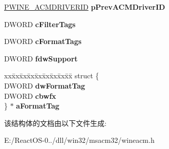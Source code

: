 \begin{DoxyCompactItemize}
\item 
\mbox{\label{struct___w_i_n_e___a_c_m_d_r_i_v_e_r_i_d_a5faa886450ad2e683dde696650d52ecd}} 
\hyperlink{struct___w_i_n_e___a_c_m_d_r_i_v_e_r_i_d}{P\+W\+I\+N\+E\+\_\+\+A\+C\+M\+D\+R\+I\+V\+E\+R\+ID} {\bfseries p\+Prev\+A\+C\+M\+Driver\+ID}
\item 
\mbox{\label{struct___w_i_n_e___a_c_m_d_r_i_v_e_r_i_d_ac4212ffb69fd5502901a0599d63cd58d}} 
D\+W\+O\+RD {\bfseries c\+Filter\+Tags}
\item 
\mbox{\label{struct___w_i_n_e___a_c_m_d_r_i_v_e_r_i_d_ad9f54979cb8f7a02d738ad0c9209b10a}} 
D\+W\+O\+RD {\bfseries c\+Format\+Tags}
\item 
\mbox{\label{struct___w_i_n_e___a_c_m_d_r_i_v_e_r_i_d_a28c8df65725727f2fb10f0c61301c9a6}} 
D\+W\+O\+RD {\bfseries fdw\+Support}
\item 
\mbox{\label{struct___w_i_n_e___a_c_m_d_r_i_v_e_r_i_d_a4395b550c2bce4531aeacded2275c12d}} 
\begin{tabbing}
xx\=xx\=xx\=xx\=xx\=xx\=xx\=xx\=xx\=\kill
struct \{\\
\>DWORD {\bfseries dwFormatTag}\\
\>DWORD {\bfseries cbwfx}\\
\} $\ast$ {\bfseries aFormatTag}\\

\end{tabbing}\end{DoxyCompactItemize}


该结构体的文档由以下文件生成\+:\begin{DoxyCompactItemize}
\item 
E\+:/\+React\+O\+S-\/0../dll/win32/msacm32/wineacm.\+h\end{DoxyCompactItemize}
